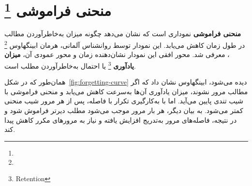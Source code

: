 \documentclass[12pt]{report}
\newtheorem{defn}[thm]{تعریف}
\begin{document}




\section{منحنی فراموشی \protect\footnote{}}
\textbf{منحنی فراموشی}
نموداری است که نشان می‌دهد چگونه میزان به‌خاطرآوردن 
مطالب در طول زمان کاهش می‌یابد.
 این نمودار توسط روانشناس آلمانی،
 هرمان ابینگهاوس
\footnote{}
 ، معرفی شد. محور 
افقی این نمودار نشان‌دهنده زمان و
 محور عمودی آن،
\textbf{میزان یادآوری}
\footnote{Retention} یا احتمال به‌خاطرآوردن مطلب است.

همان‌طور که در شکل~\ref{fig:forgetting-curve} دیده می‌شود، ابینگهاوس نشان داد که
 اگر مطالب مرور نشوند، میزان یادآوری آن‌ها به‌سرعت کاهش می‌یابد و منحنی فراموشی با شیب تندی پایین می‌آید.
  اما با به‌کارگیری تکرار با فاصله، پس از هر مرور شیب منحنی کمتر می‌شود. به بیان دیگر، 
هر بار مرور موجب می‌شود مطلب دیرتر فراموش شود 
و در نتیجه، فاصله‌های مرور به‌تدریج افزایش یافته و
 نیاز به مرورهای مکرر کاهش پیدا کند.
\end{document}
